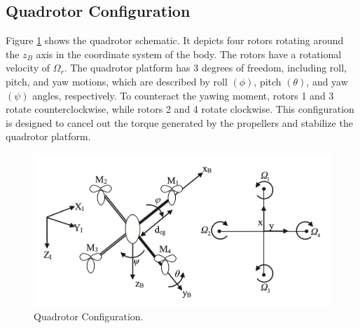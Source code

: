 \documentclass[preprint,12pt,authoryear]{elsarticle}
\begin{document}
 \subsection{Quadrotor Configuration}
\noindent Figure \ref{fig:schematic} shows the quadrotor schematic. It depicts four rotors rotating around the $z_B$ axis in the coordinate system of the body. The rotors have a rotational velocity of $\Omega_r$.
The quadrotor platform has 3 degrees of freedom, including roll, pitch, and yaw motions, which are described by roll $(\phi)$, pitch $(\theta)$, and yaw $(\psi)$ angles, respectively. %
To counteract the yawing moment, rotors 1 and 3 rotate counterclockwise, while rotors 2 and 4 rotate clockwise. This configuration is designed to cancel out the torque generated by the propellers and stabilize the quadrotor platform. %
\begin{figure}[H]
    \centering
    \includegraphics[width=12cm]{../Figure/schematic.png}
    \caption{Quadrotor Configuration.}
    \label{fig:schematic}
\end{figure}
\end{document}
